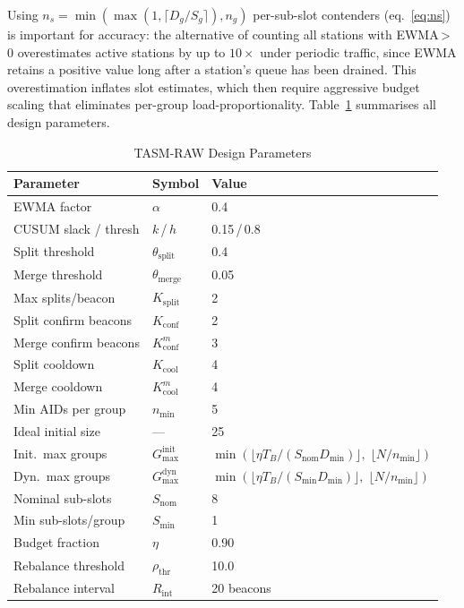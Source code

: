 \documentclass[conference]{IEEEtran}
\begin{document}
Using $n_s\!=\!\min(\max(1,\lceil D_g/S_g\rceil),n_g)$ per-sub-slot
contenders (eq.~\eqref{eq:ns}) is important for accuracy: the alternative
of counting all stations with EWMA\,>\,0 overestimates active stations by
up to $10\times$ under periodic traffic, since EWMA retains a positive
value long after a station's queue has been drained.
This overestimation inflates slot estimates, which then require aggressive
budget scaling that eliminates per-group load-proportionality.
Table~\ref{tab:params} summarises all design parameters.

\begin{table}[!t]
\renewcommand{\arraystretch}{1.15}
\caption{TASM-RAW Design Parameters}
\label{tab:params}
\centering
\begin{tabular}{@{}lll@{}}
\toprule
\textbf{Parameter} & \textbf{Symbol} & \textbf{Value} \\
\midrule
EWMA factor           & $\alpha$                   & 0.4 \\
CUSUM slack / thresh  & $k$\,/\,$h$                & 0.15\,/\,0.8 \\
Split threshold       & $\theta_\mathrm{split}$    & 0.4 \\
Merge threshold       & $\theta_\mathrm{merge}$    & 0.05 \\
Max splits/beacon     & $K_\mathrm{split}$         & 2 \\
Split confirm beacons & $K_\mathrm{conf}$          & 2 \\
Merge confirm beacons & $K_\mathrm{conf}^m$        & 3 \\
Split cooldown        & $K_\mathrm{cool}$          & 4 \\
Merge cooldown        & $K_\mathrm{cool}^m$        & 4 \\
Min AIDs per group    & $n_\mathrm{min}$           & 5 \\
Ideal initial size    & ---                        & 25 \\
Init.\ max groups     & $G_\mathrm{max}^\mathrm{init}$ & $\min\!\left(\lfloor\eta T_B/(S_\mathrm{nom}D_\mathrm{min})\rfloor,\;\lfloor N/n_\mathrm{min}\rfloor\right)$ \\
Dyn.\ max groups      & $G_\mathrm{max}^\mathrm{dyn}$  & $\min\!\left(\lfloor\eta T_B/(S_\mathrm{min}D_\mathrm{min})\rfloor,\;\lfloor N/n_\mathrm{min}\rfloor\right)$ \\
Nominal sub-slots     & $S_\mathrm{nom}$           & 8 \\
Min sub-slots/group   & $S_\mathrm{min}$           & 1 \\
Budget fraction       & $\eta$                     & 0.90 \\
Rebalance threshold   & $\rho_\mathrm{thr}$        & 10.0 \\
Rebalance interval    & $R_\mathrm{int}$           & 20 beacons \\
\bottomrule
\end{tabular}
\end{table}
\end{document}
